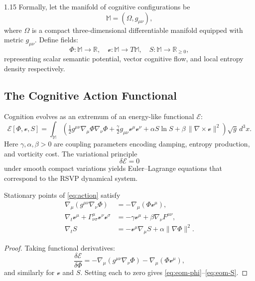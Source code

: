\documentclass[12pt,a4paper]{article}
\begin{document}
\begin{spacing}{1.15}
Formally, let the manifold of cognitive configurations be
\[
\mathbb{M} = (\Omega, g_{\mu\nu}),
\]
where \(\Omega\) is a compact three-dimensional differentiable manifold equipped with metric \(g_{\mu\nu}\).
Define fields:
\[
\Phi: \mathbb{M} \to \mathbb{R}, \quad 
\boldsymbol{\mathcal{v}}: \mathbb{M} \to T\mathbb{M}, \quad
S: \mathbb{M} \to \mathbb{R}_{\ge 0},
\]
representing scalar semantic potential, vector cognitive flow, and local entropy density respectively.

\subsection{The Cognitive Action Functional}

Cognition evolves as an extremum of an energy-like functional \(\mathcal{E}\):
\begin{equation}
\mathcal{E}[\Phi, \boldsymbol{\mathcal{v}}, S]
= \int_{\mathbb{M}} 
\left(
 \tfrac{1}{2} g^{\mu\nu} \nabla_\mu \Phi \nabla_\nu \Phi
 + \tfrac{\gamma}{2} g_{\mu\nu} \mathcal{v}^\mu \mathcal{v}^\nu
 + \alpha S \ln S
 + \beta\, \|\nabla \times \boldsymbol{\mathcal{v}}\|^2
\right) \sqrt{g}\, d^3x.
\label{eq:action}
\end{equation}
Here \(\gamma, \alpha, \beta > 0\) are coupling parameters encoding damping, entropy production, and vorticity cost. The variational principle
\[
\delta \mathcal{E} = 0
\]
under smooth compact variations yields Euler--Lagrange equations that correspond to the RSVP dynamical system.

\begin{theorem}
Stationary points of \eqref{eq:action} satisfy
\begin{align}
\nabla_\mu ( g^{\mu\nu} \nabla_\nu \Phi ) &= - \nabla_\mu (\Phi \mathcal{v}^\mu),
\label{eq:eom-phi}\\
\nabla_t \mathcal{v}^\mu + \Gamma^\mu_{\nu\sigma} \mathcal{v}^\nu \mathcal{v}^\sigma
&= -\gamma \mathcal{v}^\mu + \beta \nabla_\nu F^{\mu\nu},
\label{eq:eom-v}\\
\nabla_t S &= -\mathcal{v}^\mu \nabla_\mu S + \alpha \|\nabla \Phi\|^2.
\label{eq:eom-S}
\end{align}
\end{theorem}

\begin{proof}
Taking functional derivatives:
\[
\frac{\delta \mathcal{E}}{\delta \Phi}
 = -\nabla_\mu ( g^{\mu\nu} \nabla_\nu \Phi ) - \nabla_\mu (\Phi \mathcal{v}^\mu),
\]
and similarly for \( \boldsymbol{\mathcal{v}} \) and \(S\).
Setting each to zero gives \eqref{eq:eom-phi}–\eqref{eq:eom-S}.
\end{proof}


\end{spacing}
\end{document}
